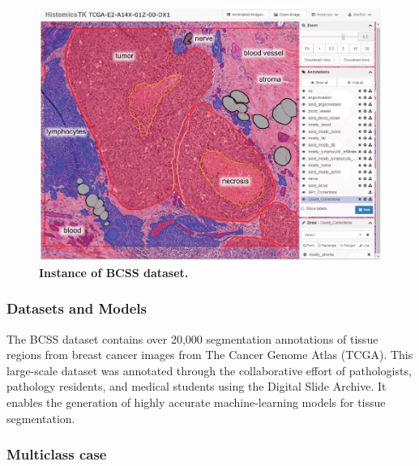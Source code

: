 \documentclass{article}
\begin{document}
\begin{figure}
	\advance\leftskip-0.5cm
	\includegraphics[width=8in]{img/bcss_instance.jpeg}
	\caption{{\bf Instance of BCSS dataset.}}
	\label{fig:bcss_example}
\end{figure} 

\subsubsection{Datasets and Models}

The BCSS dataset contains over 20,000 segmentation annotations of tissue regions from breast cancer images from The Cancer Genome Atlas (TCGA). This large-scale dataset was annotated through the collaborative effort of pathologists, pathology residents, and medical students using the Digital Slide Archive. It enables the generation of highly accurate machine-learning models for tissue segmentation.

\subsubsection{Multiclass case}
\end{document}
